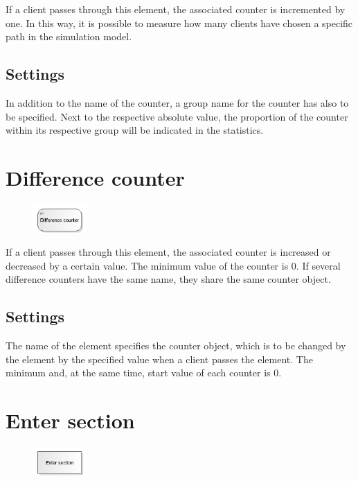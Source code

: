 If a client passes through this element, the associated counter is incremented by one.
In this way, it is possible to measure how many clients have chosen a specific path in the simulation model.

\subsection*{Settings}

In addition to the name of the counter, a group name for the counter has also to be specified.
Next to the respective absolute value, the proportion of the counter within its respective group
will be indicated in the statistics.


\section{Difference counter}
\label{ref:ModelElementDifferentialCounter}

\begin{figure}
\vspace{-22pt}
\includegraphics[width=2cm]{imageModelElementDifferentialCounter.png}
\vspace{-22pt}
\end{figure}

If a client passes through this element, the associated counter is increased or decreased by a certain value.
The minimum value of the counter is 0. If several difference counters have the same name, they share the same
counter object.

\subsection*{Settings}

The name of the element specifies the counter object, which is to be changed by the element by the specified value
when a client passes the element. The minimum and, at the same time, start value of each counter is 0.


\section{Enter section}
\label{ref:ModelElementSectionStart}

\begin{figure}
\vspace{-22pt}
\includegraphics[width=2cm]{imageModelElementSectionStart.png}
\vspace{-22pt}
\end{figure}

